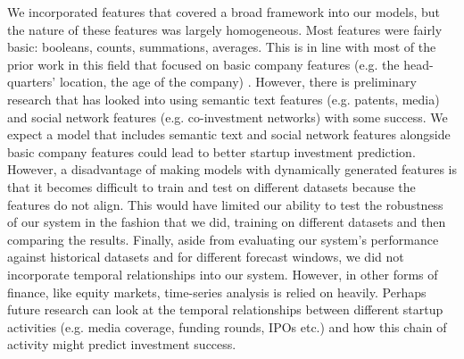 \documentclass[../thesis/thesis.tex]{subfiles}
\begin{document}
We incorporated features that covered a broad framework into our models, but the nature of these features was largely homogeneous. Most features were fairly basic: booleans, counts, summations, averages. This is in line with most of the prior work in this field that focused on basic company features (e.g. the head-quarters' location, the age of the company) \cite{beckwith2016,gimmon2010}. However, there is preliminary research that has looked into using semantic text features (e.g. patents, media) \cite{hoenen2014,yuan2016} and social network features (e.g. co-investment networks) \cite{werth2013,yu2015,cheng2016} with some success. We expect a model that includes semantic text and social network features alongside basic company features could lead to better startup investment prediction. However, a disadvantage of making models with dynamically generated features is that it becomes difficult to train and test on different datasets because the features do not align. This would have limited our ability to test the robustness of our system in the fashion that we did, training on different datasets and then comparing the results. Finally, aside from evaluating our system's performance against historical datasets and for different forecast windows, we did not incorporate temporal relationships into our system. However, in other forms of finance, like equity markets, time-series analysis is relied on heavily. Perhaps future research can look at the temporal relationships between different startup activities (e.g. media coverage, funding rounds, IPOs etc.) and how this chain of activity might predict investment success.

\end{document}
